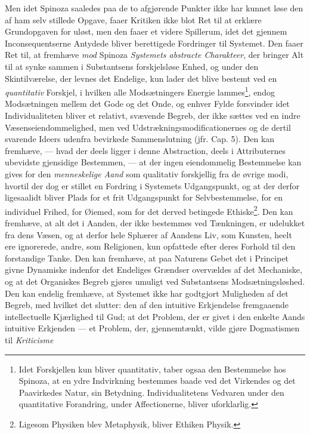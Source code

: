 \documentclass[12pt,a4paper]{book}
\newcommand{\opage}[1]{\marginnote{\footnotesize\textit{[#1]}}}
\begin{document}
Men idet Spinoza saaledes paa de to afgjørende Punkter
ikke har kunnet løse den af ham selv stillede Opgave, faaer
Kritiken ikke blot Ret til at erklære Grundopgaven for
uløst, men den faaer et videre Spillerum, idet det gjennem
Inconsequentserne Antydede bliver berettigede Fordringer til
Systemet. Den faaer Ret til, at fremhæve \emph{mod} Spinoza
\emph{Systemets abstracte Charakteer}, der bringer Alt til
at synke sammen i Substantsens forskjelsløse Enhed, og
under den Skintilværelse, der levnes det Endelige, kun lader
det blive bestemt ved en \emph{quantitativ} Forskjel, i hvilken
alle Modsætningers Energie lammes\footnote{Idet Forskjellen
kun bliver quantitativ, taber ogsaa den Bestemmelse
hos Spinoza, at en ydre Indvirkning bestemmes baade ved det
Virkendes og det Paavirkedes Natur, sin Betydning. Individualitetens
Vedvaren under den quantitative Forandring, under
Affectionerne, bliver uforklarlig.}, endog Modsætningen
mellem det Gode og det Onde, og enhver Fylde forsvinder
idet Individualiteten bliver et relativt, svævende Begreb, der
ikke sættes ved en indre Væsenseiendommelighed, men ved
Udstrækningsmodificationernes og de dertil svarende Ideers
udenfra bevirkede Sammenslutning (jfr. Cap. 5). Den kan
fremhæve, --- hvad der deels ligger i denne Abstraction, deels i
Attributernes ubevidste gjensidige Bestemmen, --- at der ingen
eiendommelig Bestemmelse kan gives for den \emph{menneskelige
Aand} som qualitativ forskjellig fra de øvrige modi,
hvortil der dog er stillet en Fordring i Systemets Udgangspunkt,
og at der derfor ligesaalidt bliver Plads for et frit
\opage{180} \setcounter{footnote}{0}%
Udgangspunkt for Selvbestemmelse, for en individuel Frihed,
for Øiemed, som for det derved betingede Ethiske\footnote{Ligesom
Physiken blev Metaphysik, bliver Ethiken Physik.}. Den
kan fremhæve, at alt det i Aanden, der ikke bestemmes ved
Tænkningen, er udelukket fra dens Væsen, og at derfor hele
Sphærer af Aandens Liv, som Kunsten, heelt ere ignorerede,
andre, som Religionen, kun opfattede efter deres Forhold
til den forstandige Tanke. Den kan fremhæve, at paa Naturens
Gebet det i Principet givne Dynamiske indenfor det
Endeliges Grændser overvældes af det Mechaniske, og at
det Organiskes Begreb gjøres umuligt ved Substantsens Modsætningsløshed.
Den kan endelig fremhæve, at Systemet
ikke har godtgjort Muligheden af det Begreb, med hvilket
det slutter: den af den intuitive Erkjendelse fremgaaende
intellectuelle Kjærlighed til Gud; at det Problem, der er
givet i den enkelte Aands intuitive Erkjenden --- et Problem,
der, gjennemtænkt, vilde gjøre Dogmatismen til \emph{Kriticisme}
\end{document}
